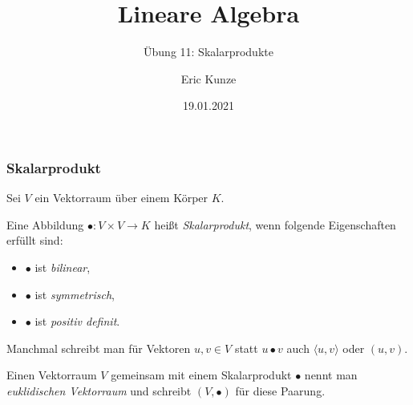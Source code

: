 \documentclass{beamer}
\begin{document}
	\title{Lineare Algebra}
	\subtitle{Übung 11: Skalarprodukte}
	\author{Eric Kunze}
	\date{19.01.2021}

	\maketitle


\begin{frame} \frametitle{Skalarprodukt}
    Sei $V$ ein Vektorraum über einem Körper $K$.

    Eine Abbildung $\bullet : V \times V \to K$ heißt \emph{Skalarprodukt}, wenn folgende Eigenschaften erfüllt sind:
    \begin{itemize}
        \item $\bullet$ ist \emph{bilinear},
        \item $\bullet$ ist \emph{symmetrisch},
        \item $\bullet$ ist \emph{positiv definit}.
    \end{itemize}

    Manchmal schreibt man für Vektoren $u,v \in V$ statt $u \bullet v$ auch $\langle u , v \rangle$ oder $(u,v)$.
    
    Einen Vektorraum $V$ gemeinsam mit einem Skalarprodukt $\bullet$ nennt man \emph{euklidischen Vektorraum} und schreibt $(V, \bullet)$ für diese Paarung.
\end{frame}
\end{document}

